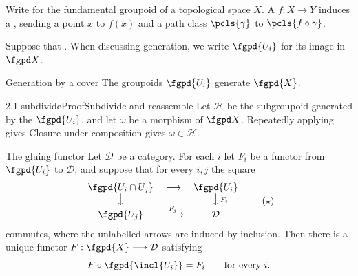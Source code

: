 Write 
for the fundamental groupoid of a topological space $X$.
A  $f:X\longrightarrow Y$ induces a
,
sending a point $x$ to $f(x)$ and a path class $\pcls{\gamma}$ to
$\pcls{f\circ\gamma}$.

\begin{fcassumptions}
Suppose that \hypCoverFamily.  When discussing generation, we write $\fgpd{U_i}$ for its image
in $\fgpd X$.

\begin{theorem}[id=2.1]{Generation by a cover}
The groupoids $\fgpd{U_i}$ generate $\fgpd{X}$.
\end{theorem}

\begin{proofpassage}{2.1-subdivide}{Proof}{Subdivide and reassemble}
Let $\mathcal H$ be the subgroupoid generated by the $\fgpd{U_i}$,
and let $\omega$ be a morphism of $\fgpd X$.
  
  Repeatedly applying  gives
Closure under composition gives $\omega\in\mathcal H$.
\end{proofpassage}

\begin{definition}[id=2.2]{The gluing functor}
Let $\mathcal D$ be a category.  For each
$i$ let $F_{i}$ be a functor from
$\fgpd{U_{i}}$ to $\mathcal{D}$, and suppose that for every $i,j$ the square
\[
  \begin{array}{ccc}
    \fgpd{U_i\cap U_j} & \longrightarrow & \fgpd{U_i} \\
    \big\downarrow && \big\downarrow\rlap{$\scriptstyle\,F_i$} \\
    \fgpd{U_j} & \xrightarrow{\ F_j\ } & \mathcal D
  \end{array}
  \tag{$\star$}\label{eq:gluing-compatibility}
\]
commutes, where the unlabelled arrows are induced by inclusion.
Then there is a unique functor $F:\fgpd{X}\longrightarrow\mathcal D$ satisfying
\[
  F\circ\fgpd{\incl{U_i}}=F_i\qquad\text{for every }i.
\]
\end{definition}


\end{fcassumptions}
